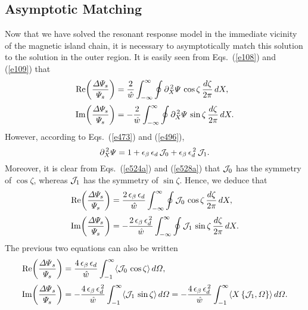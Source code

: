 \documentclass[12pt,prb,aps]{revtex4-1}
\begin{document}
\subsection{Asymptotic Matching}
Now that we have solved the resonant response model in the immediate vicinity of the magnetic island chain, it is
necessary to asymptotically match this solution to the solution in the outer region. 
It is easily seen from Eqs.~(\ref{e108}) and (\ref{e109}) that  
\begin{align}
{\rm Re}\!\left(\frac{{\mit\Delta}{\mit\Psi}_s}{{\mit\Psi}_s}\right)&=\frac{2}{\hat{w}}\int_{-\infty}^{\infty}\oint
\partial_X^{\,2}{\mit\Psi}\,\cos\zeta\,\frac{d\zeta}{2\pi}\,dX,\\[0.5ex]
{\rm Im}\!\left(\frac{{\mit\Delta}{\mit\Psi}_s}{{\mit\Psi}_s}\right)&=-\frac{2}{\hat{w}}\int_{-\infty}^{\infty}\oint
\partial_X^{\,2}{\mit\Psi}\,\sin\zeta\,\frac{d\zeta}{2\pi}\,dX.
\end{align}
However, according to Eqs.~(\ref{e473}) and (\ref{e496}),
\begin{equation}
\partial_X^{\,2}{\mit\Psi} = 1 + \epsilon_\beta\,\epsilon_d\,{\cal J}_0 + \epsilon_\beta\,\epsilon_d^{\,2}\,{\cal J}_1.
\end{equation}
Moreover, it is clear from Eqs.~(\ref{e524a}) and (\ref{e528a}) that ${\cal J}_0$ has the symmetry of $\cos\zeta$,
whereas ${\cal J}_1$ has the symmetry of $\sin\zeta$. 
Hence, we deduce that
\begin{align}
{\rm Re}\!\left(\frac{{\mit\Delta}{\mit\Psi}_s}{{\mit\Psi}_s}\right)&=\frac{2\,\epsilon_\beta\,\epsilon_d}{\hat{w}}\int_{-\infty}^{\infty}\oint
{\cal J}_0\,\cos\zeta\,\frac{d\zeta}{2\pi}\,dX,\\[0.5ex]
{\rm Im}\!\left(\frac{{\mit\Delta}{\mit\Psi}_s}{{\mit\Psi}_s}\right)&=-\frac{2\,\epsilon_\beta\,\epsilon_d^{\,2}}{\hat{w}}\int_{-\infty}^{\infty}\oint
{\cal J}_1\,\sin\zeta\,\frac{d\zeta}{2\pi}\,dX.
\end{align}
The previous two equations can also be written
\begin{align}
{\rm Re}\!\left(\frac{{\mit\Delta\Psi}_s}{{\mit\Psi}_s}\right)&=\frac{4\,\epsilon_\beta\,\epsilon_d}{\hat{w}}\int_{-1}^\infty
\langle {\cal J}_0\,\cos\zeta\rangle\,d{\mit\Omega},\label{e542}\\[0.5ex]
{\rm Im}\!\left(\frac{{\mit\Delta\Psi}_s}{{\mit\Psi}_s}\right)&=-\frac{4\,\epsilon_\beta\,\epsilon_d^{\,2}}{\hat{w}}\int_{-1}^\infty
\langle {\cal J}_1\,\sin\zeta\rangle\,d{\mit\Omega}=-\frac{4\,\epsilon_\beta\,\epsilon_d^{\,2}}{\hat{w}}\int_{-1}^\infty
\langle X\,\{{\cal J}_1,{\mit\Omega}\}\rangle\,d{\mit\Omega}.\label{e543}
\end{align}
\end{document}

